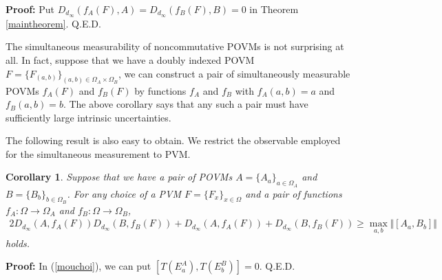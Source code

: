 \documentclass[12pt,showpacs,preprintnumbers,amsmath,amssymb]{revtex4-2}
\newtheorem{corollary}{Corollary}
\begin{document}
{\bf Proof:}
Put $D_{d_{\infty}}(f_A(F),A)=D_{d_{\infty}}(f_B(F),B)=0$ in 
Theorem \ref{maintheorem}.
\hfill Q.E.D.
\par
The simultaneous measurability of noncommutative POVMs 
is not surprising at all. In fact, suppose that we have 
a doubly indexed POVM $F=\{F_{(a,b)}\}_{(a,b)\in \Omega_A \times \Omega_B}$, 
we can construct a pair of 
simultaneously measurable
POVMs $f_A(F)$ and $f_B(F)$ 
by functions $f_A$ and $f_B$ with $f_A(a,b)=a$ and $f_B(a,b)=b$.
The above corollary says that any such a pair must have 
sufficiently large intrinsic uncertainties. 
\par
The following result is also easy to obtain.
We restrict the observable employed for the simultaneous 
measurement to PVM. 
\begin{corollary}
Suppose that we have a pair of POVMs $A=\{A_a\}_{a\in \Omega_A}$ 
and $B=\{B_b\}_{b\in \Omega_B}$. 
For any choice of a PVM
$F=\{F_x\}_{x\in \Omega}$ and a pair of functions 
$f_A: \Omega \to \Omega_A$ and $f_B: \Omega \to \Omega_B$, 
\begin{eqnarray*}
2 D_{d_{\infty}}(A, f_A(F))D_{d_{\infty}}(B, f_B(F))
+D_{d_{\infty}}(A,f_A(F))+D_{d_{\infty}}(B,f_B(F))
\geq \max_{a,b}\Vert[A_a,B_b]\Vert
\end{eqnarray*}
holds. 
\end{corollary}
{\bf Proof:}
In (\ref{mouchoi}), we can put $[T(E^A_a),T(E^B_b)]=0$.
\hfill Q.E.D.
\end{document}
